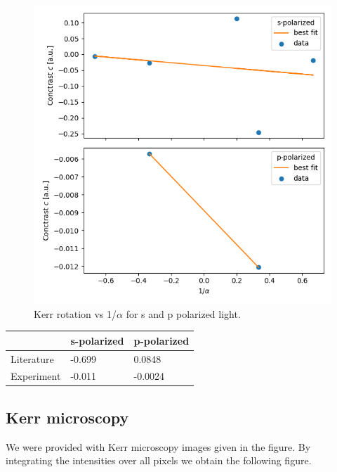 \documentclass{article}
\begin{document}
\begin{figure}[h!]
\centering
\includegraphics[width=0.6\linewidth]{LAB/MOKE/kerr_rotation.png}
\caption{Kerr rotation vs 1/$\alpha$ for s and p polarized light.}
\label{fig:exp_setup}
\end{figure}

\begin{table}[]
\centering
\begin{tabular}{|l|l|l|}
\hline
           & s-polarized & p-polarized \\ \hline
Literature & -0.699      & 0.0848      \\ \hline
Experiment & -0.011      & -0.0024     \\ \hline
\end{tabular}
\end{table}

\clearpage
\subsection{Kerr microscopy}   
We were provided with Kerr microscopy images given in the figure. By integrating the intensities over all pixels we obtain the following figure.
\end{document}
